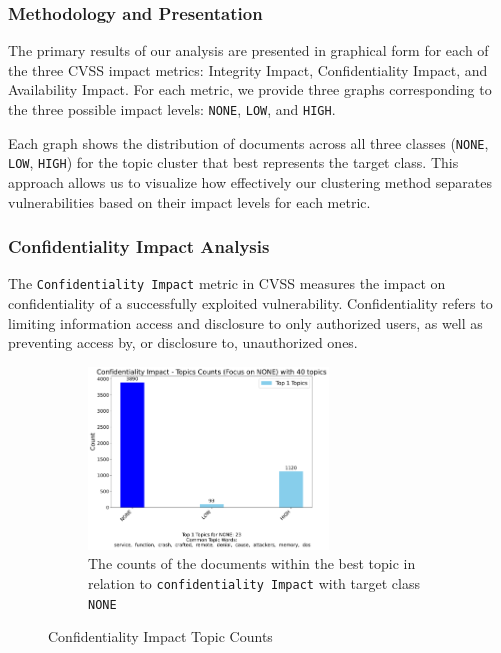 \documentclass[12pt]{article}
\begin{document}
\subsubsection{Methodology and Presentation}

The primary results of our analysis are presented in graphical form for each of the three CVSS
impact metrics: Integrity Impact, Confidentiality Impact, and Availability Impact. For each metric,
we provide three graphs corresponding to the three possible impact levels: \texttt{NONE},
\texttt{LOW}, and \texttt{HIGH}.

Each graph shows the distribution of documents across all three classes (\texttt{NONE},
\texttt{LOW}, \texttt{HIGH}) for the topic cluster that best represents the target class. This
approach allows us to visualize how effectively our clustering method separates vulnerabilities
based on their impact levels for each metric.

\subsubsection{Confidentiality Impact Analysis}

The \texttt{Confidentiality Impact} metric in CVSS measures the impact on confidentiality of a
successfully exploited vulnerability. Confidentiality refers to limiting information access and
disclosure to only authorized users, as well as preventing access by, or disclosure to, unauthorized
ones.

\begin{figure}[h!]
	\ContinuedFloat*
	\centering
	\begin{subfigure}{\textwidth}
		\centering
		\includegraphics[width=0.7\textwidth]{figures/confidentialityImpact/merged_top_k_topics_category_focus_counts_confidentialityImpact_NONE_k1.pdf}
		\caption{The counts of the documents within the best topic in relation to \texttt{confidentiality Impact} with target class \texttt{NONE}}
		\label{fig:confidentialityImpact_60_NONE}
	\end{subfigure}

	\caption{Confidentiality Impact Topic Counts}
\end{figure}
\end{document}
